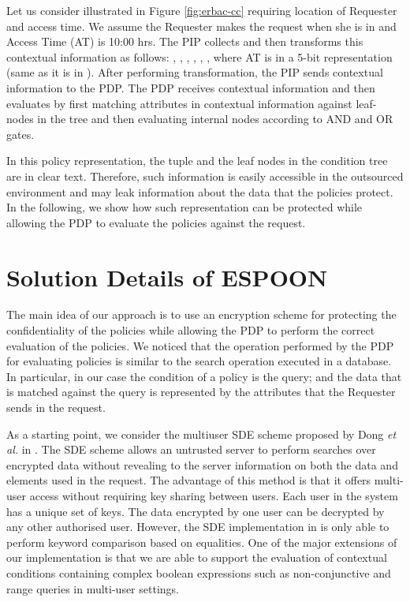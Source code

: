 \documentclass[epsfig,a4paper,11pt,titlepage]{book}
\numberwithin{algorithm}{chapter}
\begin{document}
Let us consider  illustrated in Figure \ref{fig:erbac-cc} requiring location of Requester and access time. We assume the Requester makes the request when she is in   and Access Time (AT) is 10:00 hrs. The \gls{PIP} collects and then transforms this contextual information as follows: , , , , , , where AT is in a 5-bit representation (same as it is in ). After performing transformation, the \gls{PIP} sends contextual information to the \gls{PDP}. The \gls{PDP} receives contextual information and then evaluates  by first matching attributes in contextual information against leaf-nodes in the  tree and then evaluating internal nodes according to AND and OR gates.

In this policy representation, the  tuple and the leaf nodes in the condition tree are in clear text. Therefore, such information is easily accessible in the outsourced environment and may leak information about the data that the policies protect. In the following, we show how such representation can be protected while allowing the \gls{PDP} to evaluate the policies against the request.

\section[Solution Details of ESPOON]{Solution Details of \gls{ESPOON}}
\label{sec:espoon-solution-details}

The main idea of our approach is to use an encryption scheme for protecting the confidentiality of the policies while allowing the \gls{PDP} to perform the correct evaluation of the policies. We noticed that the operation performed by the \gls{PDP} for evaluating policies is similar to the search operation executed in a database. In particular, in our case the condition of a policy is the query; and the data that is matched against the query is represented by the attributes that the Requester sends in the request.

As a starting point, we consider the multiuser \gls{SDE} scheme proposed by Dong \emph{et al.} in \cite{Dong:2011}. The \gls{SDE} scheme allows an untrusted server to perform searches over encrypted data without revealing to the server information on both the data and elements used in the request. The advantage of this method is that it offers multi-user access without requiring key sharing between users. Each user in the system has a unique set of keys. The data encrypted by one user can be decrypted by any other authorised user. However, the \gls{SDE} implementation in \cite{Dong:2011} is only able to perform keyword comparison based on equalities. One of the major extensions of our implementation is that we are able to support the evaluation of contextual conditions containing complex boolean expressions such as non-conjunctive and range queries in multi-user settings.
\end{document}
